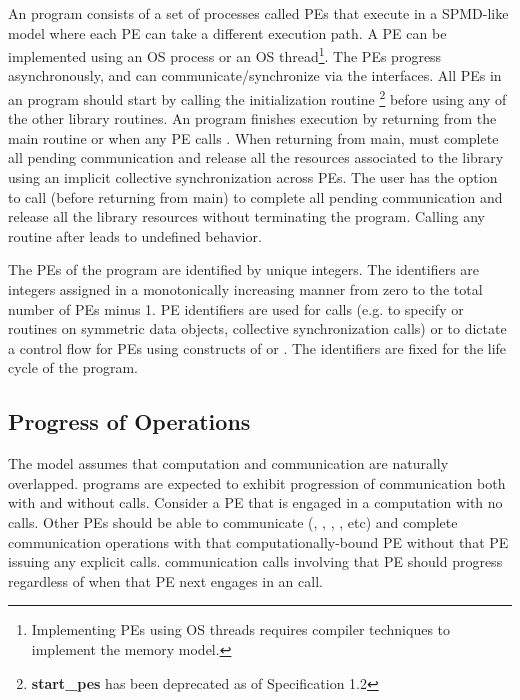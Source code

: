 An \openshmem program consists of a set of \openshmem processes called \ac{PE}s
that execute in a \ac{SPMD}-like model where each \ac{PE} can take a different
execution path. A \ac{PE} can be implemented using an OS process or an OS
thread\footnote{Implementing \ac{PE}s using OS threads requires compiler
techniques to implement the \openshmem memory model.}.  The \ac{PE}s progress
asynchronously, and can communicate/synchronize via the \openshmem interfaces.
All \ac{PE}s in an \openshmem program should start by calling the initialization
routine   \footnote{\textbf{start\_pes} has been
deprecated as of Specification 1.2} before using any of the other \openshmem
library routines.  An \openshmem program finishes execution by returning from
the main routine or when any PE calls . When returning
from main, \openshmem must complete all pending communication and release all
the resources associated to the library using an implicit collective
synchronization across PEs. The user has the option to call
 (before returning from main) to complete all pending
communication and release all the \openshmem library resources without
terminating the program. Calling any \openshmem routine after
 leads to undefined behavior.

The \ac{PE}s of the \openshmem program are identified by unique integers.
The identifiers are integers assigned in a monotonically increasing manner from
zero to the total number of \ac{PE}s minus 1. \ac{PE} identifiers are used for
\openshmem calls (e.g. to specify \PUT or \GET routines on symmetric data
objects, collective synchronization calls) or to dictate a control flow
for \ac{PE}s using constructs of \Clang or \Fortran. The identifiers are fixed
for the life cycle of the \openshmem program.

\subsection{Progress of \openshmem Operations}\label{subsec:progress}

The \openshmem model assumes that computation and communication are naturally
overlapped. \openshmem programs are expected to exhibit progression of
communication both with and without \openshmem calls. Consider a \ac{PE} that is
engaged in a computation with no \openshmem calls. Other \ac{PE}s should be able
to communicate (, , , , etc) and
complete communication operations with that computationally-bound \ac{PE}
without that \ac{PE} issuing any explicit \openshmem calls. \openshmem
communication calls involving that \ac{PE} should progress regardless of when
that \ac{PE} next engages in an \openshmem call.

